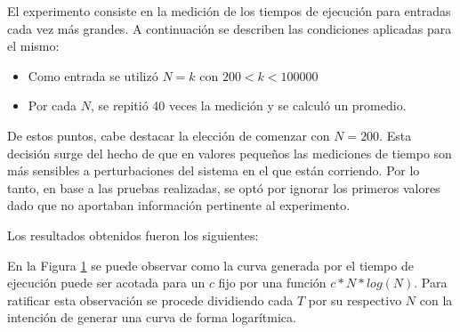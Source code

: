 	El experimento consiste en la medición de los tiempos de ejecución para
	entradas cada vez más grandes. A continuación se describen las condiciones aplicadas
	para el mismo:

	\begin{itemize}
		\item{Como entrada se utilizó $N = k$ con $200 < k < 100000$}
		\item{Por cada $N$, se repitió 40 veces la medición y se calculó un
			promedio.}
	\end{itemize}

	De estos puntos, cabe destacar la elección de comenzar con $N = 200$. Esta
	decisión surge del hecho de que en valores pequeños las mediciones de tiempo
	son más sensibles a perturbaciones del sistema en el que están corriendo.
	Por lo tanto, en base a las pruebas realizadas, se optó por ignorar los
	primeros valores dado que no aportaban información pertinente al experimento.

	Los resultados obtenidos fueron los siguientes:

	\newcommand\constante{3}
	\begin{figure}[H]
		\centering
		\caption{}
		\label{fig:exp1:tiempo_base}
	\end{figure}

	En la Figura \ref{fig:exp1:tiempo_base} se puede observar como la curva generada por el
	tiempo de ejecución puede ser acotada para un $c$ fijo por una función
	$c*N*log(N)$. Para ratificar esta observación se procede dividiendo cada $T$
	por su respectivo $N$ con la intención de generar una curva de forma
	logarítmica.

